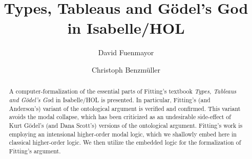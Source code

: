 \documentclass{llncs}
\begin{document}
%
\frontmatter          %
%
\pagestyle{headings}  %

%
\mainmatter              %
%
\title{Types, Tableaus and G\"odel's God \\ in Isabelle/HOL}
%
\author{David Fuenmayor \and Christoph Benzm\"uller}
%

%

\maketitle              %

\begin{abstract}
	A computer-formalization of the essential parts of Fitting's textbook
	\emph{Types, Tableaus and G\"odel's Go}d in Isabelle/HOL is
	presented. In particular, Fitting's (and Anderson's) variant of the ontological
	argument is verified and confirmed. This variant avoids the modal
	collapse, which has been criticized as an undesirable side-effect of Kurt G\"odel's (and
	Dana Scott's) versions of the ontological argument. Fitting's work
	is employing an intensional higher-order modal logic, which we
	shallowly embed here in classical higher-order logic. We then
	utilize the embedded logic for the formalization of Fitting's argument.
\end{abstract}






%




%
\end{document}
